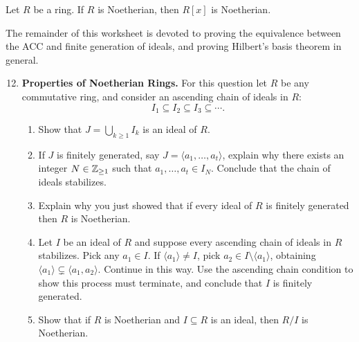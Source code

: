 \documentclass[12pt,reqno]{amsart}
\begin{document}
\begin{theorem}
	Let $R$ be a ring. If $R$ is Noetherian, then $R[x]$ is Noetherian.
\end{theorem}

The remainder of this worksheet is devoted to proving the equivalence between the ACC and finite generation of ideals, and proving Hilbert's basis theorem in general. 

\hrulefill 

\begin{enumerate}[leftmargin=*]
\setcounter{enumi}{11}

\item \textbf{Properties of Noetherian Rings.} For this question let $R$ be any commutative ring, and consider an ascending chain of ideals in $R$:
\[
I_1\subseteq I_2\subseteq I_3\subseteq \cdots.
\]
\begin{enumerate}[label=(\alph*),ref=\theenumi\alph*]
    \item Show that $J=\bigcup_{k\geq 1} I_k$ is an ideal of $R$. 
    
    \item If $J$ is finitely generated, say $J=\langle a_1,\ldots,a_t \rangle$, explain why there exists an integer $N\in \mathbb{Z}_{\geq1}$ such that $a_1,\ldots,a_t \in I_{N}$. Conclude that the chain of ideals stabilizes.
    
    \item Explain why you just showed that if every ideal of $R$ is finitely generated then $R$ is Noetherian. 
    
    \item  Let $I$ be an ideal of $R$ and suppose every ascending chain of ideals in $R$ stabilizes. Pick any $a_1\in I$. If $\langle a_1\rangle \neq I$, pick $a_2\in I\setminus \langle a_1\rangle$, obtaining $\langle a_1\rangle \subsetneq \langle a_1,a_2\rangle$. Continue in this way. Use the ascending chain condition to show this process must terminate, and conclude that $I$ is finitely generated.
    
    \item Show that if $R$ is Noetherian and $I\subseteq R$ is an ideal, then $R/I$ is Noetherian.
\end{enumerate}


\end{enumerate}
\end{document}
